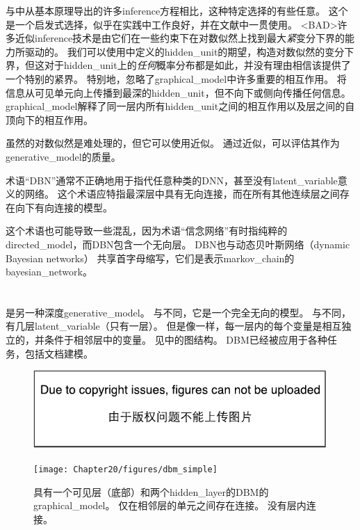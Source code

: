 与中从基本原理导出的许多\gls{inference}方程相比，这种特定选择的有些任意。
这个是一个启发式选择，似乎在实践中工作良好，并在文献中一贯使用。
<BAD>许多近似\gls{inference}技术是由它们在一些约束下在对数似然上找到最大\emph{紧}变分下界的能力所驱动的。
我们可以使用中定义的\gls{hidden_unit}的期望，构造对数似然的变分下界，但这对于\gls{hidden_unit}上的\emph{任何}概率分布都是如此，并没有理由相信该提供了一个特别的紧界。
特别地，忽略了\gls{graphical_model}中许多重要的相互作用。
将信息从可见单元向上传播到最深的\gls{hidden_unit}，但不向下或侧向传播任何信息。
\gls{graphical_model}解释了同一层内所有\gls{hidden_unit}之间的相互作用以及层之间的自顶向下的相互作用。


虽然的对数似然是难处理的，但它可以使用近似\citep{Salakhutdinov+Murray-2008}。
通过近似，可以评估其作为\gls{generative_model}的质量。


术语``\gls{DBN}''通常不正确地用于指代任意种类的\gls{DNN}，甚至没有\gls{latent_variable}意义的网络。
这个术语应特指最深层中具有无向连接，而在所有其他连续层之间存在向下有向连接的模型。

这个术语也可能导致一些混乱，因为术语``信念网络''有时指纯粹的\gls{directed_model}，而\gls{DBN}包含一个无向层。
\gls{DBN}也与动态贝叶斯网络（dynamic Bayesian networks） \citep{Dean+Kanazawa-1989}共享首字母缩写，它们是表示\gls{markov_chain}的\gls{bayesian_network}。


\section{}
\label{sec:deep_boltzmann_machines}

 \citep{SalHinton09}是另一种深度\gls{generative_model}。
与不同，它是一个完全无向的模型。
与不同，有几层\gls{latent_variable}（只有一层）。
但是像一样，每一层内的每个变量是相互独立的，并条件于相邻层中的变量。
见中的图结构。
\gls{DBM}已经被应用于各种任务，包括文档建模\citep{srivastava2013modeling}。

\begin{figure}[!htb]
\ifOpenSource
\centerline{\includegraphics{figure.pdf}}
\else
\centerline{\texttt{[image: Chapter20/figures/dbm\_simple]}}
\fi
\caption{具有一个可见层（底部）和两个\gls{hidden_layer}的\gls{DBM}的\gls{graphical_model}。
仅在相邻层的单元之间存在连接。
没有层内连接。}
\label{fig:chap20_dbm_simple}
\end{figure}

